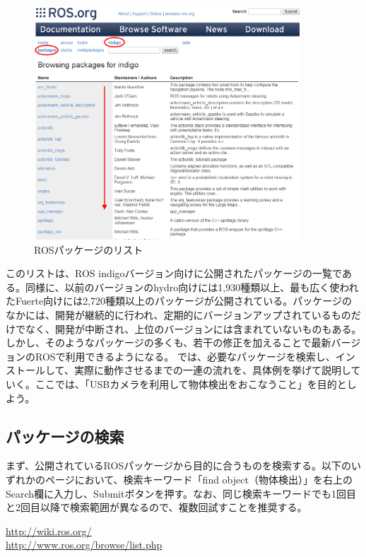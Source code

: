 \begin{figure}[htp]
  \centering
  \includegraphics[width=10cm]{pictures/chapter7/pic_07_04.png}
  \caption{ROSパッケージのリスト}
\end{figure}


このリストは、ROS indigoバージョン向けに公開されたパッケージの一覧である。同様に、以前のバージョンのhydro向けには1,930種類以上、最も広く使われたFuerte向けには2,720種類以上のパッケージが公開されている。パッケージのなかには、開発が継続的に行われ、定期的にバージョンアップされているものだけでなく、開発が中断され、上位のバージョンには含まれていないものもある。しかし、そのようなパッケージの多くも、若干の修正を加えることで最新バージョンのROSで利用できるようになる。
では、必要なパッケージを検索し、インストールして、実際に動作させるまでの一連の流れを、具体例を挙げて説明していく。ここでは、「USBカメラを利用して物体検出をおこなうこと」を目的としよう。

\subsection{パッケージの検索}

まず、公開されているROSパッケージから目的に合うものを検索する。以下のいずれかのページにおいて、検索キーワード「find object（物体検出）」を右上のSearch欄に入力し、Submitボタンを押す。なお、同じ検索キーワードでも1回目と2回目以降で検索範囲が異なるので、複数回試すことを推奨する。

\vspace{\baselineskip}
\noindent\url{http://wiki.ros.org/}\\
\noindent\url{http://www.ros.org/browse/list.php}
\vspace{\baselineskip}

